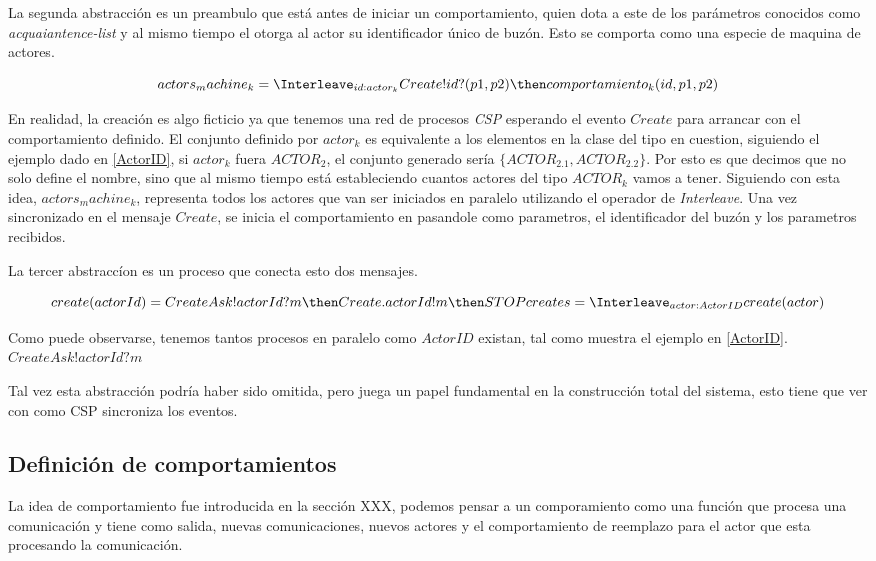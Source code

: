 \documentclass[fleqn]{article}
\begin{document}
La segunda abstracción es un preambulo que está antes de iniciar un comportamiento, quien dota a este de 
los parámetros conocidos como \textit{acquaiantence-list} y al mismo tiempo el otorga 
al actor su identificador único de buzón. Esto se comporta como una especie de maquina de actores.

\[
actors_machine_k = \Interleave_{ id : actor_k } Create!id?(p1, p2) \then
comportamiento_k(id, p1, p2)
\]

En realidad, la creación es algo ficticio ya que tenemos una red de
procesos \textit{CSP} esperando el evento $Create$ para arrancar con el
comportamiento definido.
El conjunto definido por $actor_k$ es equivalente a los elementos en la clase 
del tipo en cuestion, siguiendo el ejemplo dado en \ref{ActorID}, si $actor_k$ 
fuera $ACTOR_2$, el conjunto generado sería $\{ ACTOR_2.1, ACTOR_2.2 \}$.
Por esto es que decimos que no solo define el nombre, sino que al mismo tiempo está
estableciendo cuantos actores del tipo $ACTOR_k$ vamos a tener.
Siguiendo con esta idea, $actors_machine_k$, representa todos los actores 
que van ser iniciados en paralelo utilizando el operador de \textit{Interleave}.
Una vez sincronizado en el mensaje $Create$, se inicia el comportamiento en 
pasandole como parametros, el identificador del buzón y los parametros recibidos.

La tercer abstraccíon es un proceso que conecta esto dos mensajes. 
 
\[
create(actorId) = CreateAsk!actorId?m \then Create.actorId!m \then STOP
creates = \Interleave_{actor : ActorID} create(actor)
\]

Como puede observarse, tenemos tantos procesos en paralelo como $ActorID$ existan, 
tal como muestra el ejemplo en \ref{ActorID}. $CreateAsk!actorId?m$

Tal vez esta abstracción podría haber sido omitida, pero juega un papel fundamental
en la construcción total del sistema, esto tiene que ver con como CSP sincroniza los 
eventos.


\subsection{Definición de comportamientos}
La idea de comportamiento fue introducida en la sección XXX, podemos pensar a un
comporamiento como una función que procesa una comunicación y tiene como salida,
nuevas comunicaciones, nuevos actores y el comportamiento de reemplazo para el
actor que esta procesando la comunicación.
\end{document}
